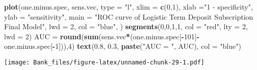\documentclass[
]{article}
\newenvironment{Shaded}{\begin{snugshade}}{\end{snugshade}}
\newcommand{\AttributeTok}[1]{\textcolor[rgb]{0.13,0.29,0.53}{#1}}
\newcommand{\DecValTok}[1]{\textcolor[rgb]{0.00,0.00,0.81}{#1}}
\newcommand{\FloatTok}[1]{\textcolor[rgb]{0.00,0.00,0.81}{#1}}
\newcommand{\FunctionTok}[1]{\textcolor[rgb]{0.13,0.29,0.53}{\textbf{#1}}}
\newcommand{\NormalTok}[1]{#1}
\newcommand{\OtherTok}[1]{\textcolor[rgb]{0.56,0.35,0.01}{#1}}
\newcommand{\SpecialCharTok}[1]{\textcolor[rgb]{0.81,0.36,0.00}{\textbf{#1}}}
\newcommand{\StringTok}[1]{\textcolor[rgb]{0.31,0.60,0.02}{#1}}
\begin{document}
\begin{Shaded}
\begin{Highlighting}[]
\FunctionTok{plot}\NormalTok{(one.minus.spec, sens.vec, }\AttributeTok{type =} \StringTok{"l"}\NormalTok{, }\AttributeTok{xlim =} \FunctionTok{c}\NormalTok{(}\DecValTok{0}\NormalTok{,}\DecValTok{1}\NormalTok{),}
     \AttributeTok{xlab =}\StringTok{"1 {-} specificity"}\NormalTok{,}
     \AttributeTok{ylab =} \StringTok{"sensitivity"}\NormalTok{,}
     \AttributeTok{main =} \StringTok{"ROC curve of Logistic Term Deposit Subscription Final Model"}\NormalTok{,}
     \AttributeTok{lwd =} \DecValTok{2}\NormalTok{,}
     \AttributeTok{col =} \StringTok{"blue"}\NormalTok{, )}
\FunctionTok{segments}\NormalTok{(}\DecValTok{0}\NormalTok{,}\DecValTok{0}\NormalTok{,}\DecValTok{1}\NormalTok{,}\DecValTok{1}\NormalTok{, }\AttributeTok{col =} \StringTok{"red"}\NormalTok{, }\AttributeTok{lty =} \DecValTok{2}\NormalTok{, }\AttributeTok{lwd =} \DecValTok{2}\NormalTok{)}
\NormalTok{AUC }\OtherTok{=} \FunctionTok{round}\NormalTok{(}\FunctionTok{sum}\NormalTok{(sens.vec}\SpecialCharTok{*}\NormalTok{(one.minus.spec[}\SpecialCharTok{{-}}\DecValTok{101}\NormalTok{]}\SpecialCharTok{{-}}\NormalTok{one.minus.spec[}\SpecialCharTok{{-}}\DecValTok{1}\NormalTok{])),}\DecValTok{4}\NormalTok{)}
\FunctionTok{text}\NormalTok{(}\FloatTok{0.8}\NormalTok{, }\FloatTok{0.3}\NormalTok{, }\FunctionTok{paste}\NormalTok{(}\StringTok{"AUC = "}\NormalTok{, AUC), }\AttributeTok{col =} \StringTok{"blue"}\NormalTok{)}
\end{Highlighting}
\end{Shaded}

\texttt{[image: Bank\_files/figure-latex/unnamed-chunk-29-1.pdf]}
\end{document}
